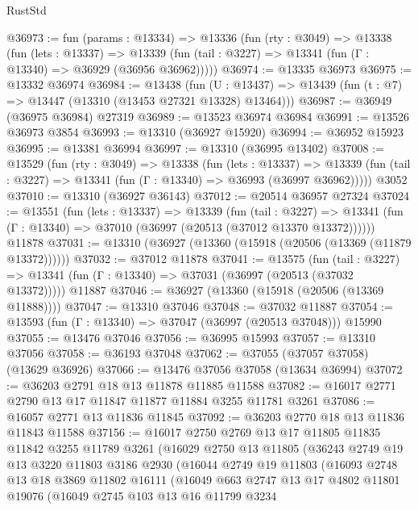 \begin{lexlean}{RustStd}
\begin{coremodule}
@36973 := fun (params : @13334) =>
  @13336
    (fun (rty : @3049) =>
    @13338
      (fun (lets : @13337) =>
      @13339 (fun (tail : @3227) => @13341 (fun (Γ : @13340) => @36929 (@36956 @36962)))))
@36974 := @13335 @36973
@36975 := @13332 @36974
@36984 := @13438
    (fun (U : @13437) => @13439 (fun (t : @7) => @13447 (@13310 (@13453 @27321 @13328) @13464)))
@36987 := @36949 (@36975 @36984) @27319
@36989 := @13523 @36974 @36984
@36991 := @13526 @36973 @3854
@36993 := @13310 (@36927 @15920)
@36994 := @36952 @15923
@36995 := @13381 @36994
@36997 := @13310 (@36995 @13402)
@37008 := @13529
    (fun (rty : @3049) =>
    @13338
      (fun (lets : @13337) =>
      @13339 (fun (tail : @3227) => @13341 (fun (Γ : @13340) => @36993 (@36997 @36962)))))
    @3052
@37010 := @13310 (@36927 @36143)
@37012 := @20514 @36957 @27324
@37024 := @13551
    (fun (lets : @13337) =>
    @13339
      (fun (tail : @3227) =>
      @13341 (fun (Γ : @13340) => @37010 (@36997 (@20513 (@37012 @13370 @13372))))))
    @11878
@37031 := @13310 (@36927 (@13360 (@15918 (@20506 (@13369 (@11879 @13372))))))
@37032 := @37012 @11878
@37041 := @13575
    (fun (tail : @3227) => @13341 (fun (Γ : @13340) => @37031 (@36997 (@20513 (@37032 @13372)))))
    @11887
@37046 := @36927 (@13360 (@15918 (@20506 (@13369 @11888))))
@37047 := @13310 @37046
@37048 := @37032 @11887
@37054 := @13593 (fun (Γ : @13340) => @37047 (@36997 (@20513 @37048))) @15990
@37055 := @13476 @37046
@37056 := @36995 @15993
@37057 := @13310 @37056
@37058 := @36193 @37048
@37062 := @37055 (@37057 @37058) (@13629 @36926)
@37066 := @13476 @37056 @37058 (@13634 @36994)
@37072 := @36203 @2791 @18 @13 @11878 @11885 @11588
@37082 := @16017 @2771 @2790 @13 @17 @11847 @11877 @11884 @3255 @11781 @3261
@37086 := @16057 @2771 @13 @11836 @11845
@37092 := @36203 @2770 @18 @13 @11836 @11843 @11588
@37156 := @16017
    @2750
    @2769
    @13
    @17
    @11805
    @11835
    @11842
    @3255
    @11789
    @3261
    (@16029
      @2750
      @13
      @11805
      (@36243
        @2749
        @19
        @13
        @3220
        @11803
        @3186
        @2930
        (@16044
          @2749
          @19
          @11803
          (@16093
            @2748
            @13
            @18
            @3869
            @11802
            @16111
            (@16049
              @663
              @2747
              @13
              @17
              @4802
              @11801
              @19076
              (@16049
                @2745
                @103
                @13
                @16
                @11799
                @3234

\end{coremodule}
\end{lexlean}
